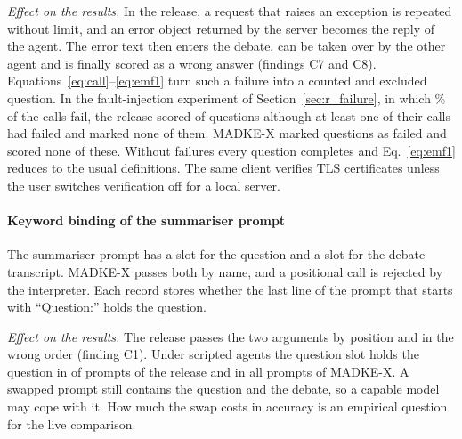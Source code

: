\emph{Effect on the results.} In the release, a request that raises an exception is repeated without limit, and an error object returned by the server becomes the reply of the agent. The error text then enters the debate, can be taken over by the other agent and is finally scored as a wrong answer (findings C7 and C8). Equations~\eqref{eq:call}--\eqref{eq:emf1} turn such a failure into a counted and excluded question. In the fault-injection experiment of Section~\ref{sec:r_failure}, in which \VFailRate\% of the calls fail, the release scored \VFailScoredRel{} of \VFailNAll{} questions although at least one of their calls had failed and marked none of them. MADKE-X marked \VFailFlaggedX{} questions as failed and scored none of these. Without failures every question completes and Eq.~\eqref{eq:emf1} reduces to the usual definitions. The same client verifies TLS certificates unless the user switches verification off for a local server.

\paragraph{Keyword binding of the summariser prompt}
The summariser prompt has a slot for the question and a slot for the debate transcript. MADKE-X passes both by name, and a positional call is rejected by the interpreter. Each record stores whether the last line of the prompt that starts with ``Question:'' holds the question.

\emph{Effect on the results.} The release passes the two arguments by position and in the wrong order (finding C1). Under scripted agents the question slot holds the question in \VBindRel{} of \VNQuestions{} prompts of the release and in all \VBindX{} prompts of MADKE-X. A swapped prompt still contains the question and the debate, so a capable model may cope with it. How much the swap costs in accuracy is an empirical question for the live comparison.

